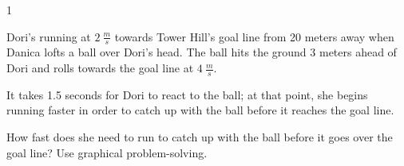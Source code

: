 
\AddToShipoutPicture*{\BackgroundPic}

\addtocounter {ProbNum} {1}

 
{\bf \Large{}} Dori's running at ${2~\tfrac{m}{s}}$ towards Tower Hill's goal line from 20 meters away when Danica lofts a ball over Dori's head.  The ball hits the ground 3 meters ahead of Dori and rolls towards the goal line at ${4~\tfrac{m}{s}}$.  

\bigskip

It takes 1.5 seconds for Dori to react to the ball; at that point, she begins running faster in order to catch up with the ball before it reaches the goal line.  

\bigskip

How fast does she need to run to catch up with the ball before it goes over the goal line? Use graphical problem-solving.

\vfill

\newpage
